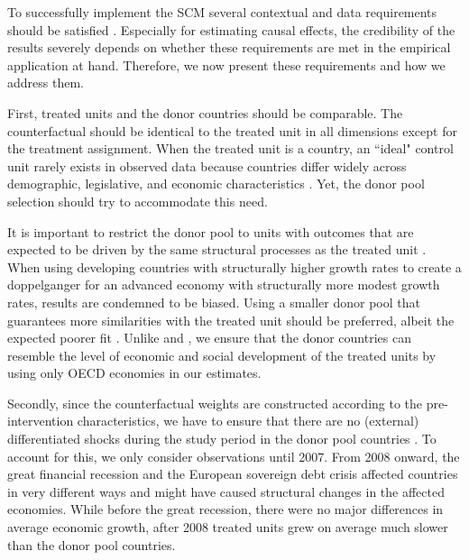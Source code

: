 \documentclass[12pt]{article}
\begin{document}
To successfully implement the SCM several contextual and data requirements should be satisfied \citep{Abadie2019}. Especially for estimating causal effects, the credibility of the results severely depends on whether these requirements are met in the empirical application at hand. Therefore, we now present these requirements and how we address them. 
 
First, treated units and the donor countries should be comparable. The counterfactual should be identical to the treated unit in all dimensions except for the treatment assignment. When the treated unit is a country, an ``ideal" control unit rarely exists in observed data because countries differ widely across demographic, legislative, and economic characteristics \citep{Born2018}. Yet, the donor pool selection should try to accommodate this need. 

It is important to restrict the donor pool to units with outcomes that are expected to be driven by the same structural processes as the treated unit \citep{Abadie2015}. When using developing countries with structurally higher growth rates to create a doppelganger for an advanced economy with structurally more modest growth rates, results are condemned to be biased. Using a smaller donor pool that guarantees more similarities with the treated unit should be preferred, albeit the expected poorer fit \citep{Abadie2003}. Unlike \cite{Puzzello2018} and \cite{Gasparotti2019}, we ensure that the donor countries can resemble the level of economic and social development of the treated units by using only OECD economies in our estimates.


Secondly, since the counterfactual weights are constructed according to the pre-intervention characteristics, we have to ensure that there are no (external) differentiated shocks during the study period in the donor pool countries \citep{Abadie2019}. To account for this, we only consider observations until 2007. From 2008 onward, the great financial recession and the European sovereign debt crisis affected countries in very different ways and might have caused structural changes in the affected economies. While before the great recession, there were no major differences in average economic growth, after 2008 treated units grew on average much slower than the donor pool countries. 
\end{document}
